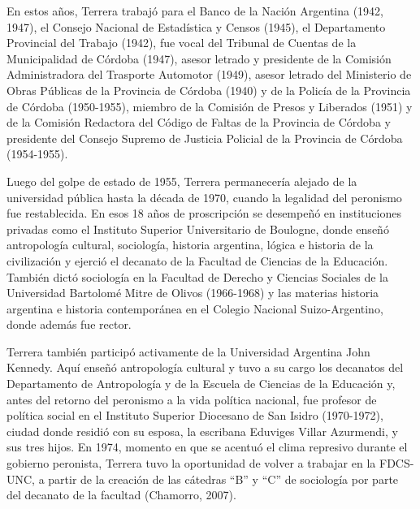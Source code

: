En estos años, Terrera trabajó para el Banco de la Nación Argentina (1942, 1947), el Consejo Nacional de Estadística y Censos (1945), el Departamento Provincial del Trabajo (1942), fue vocal del Tribunal de Cuentas de la Municipalidad de Córdoba (1947), asesor letrado y presidente de la Comisión Administradora del Trasporte Automotor (1949), asesor letrado del Ministerio de Obras Públicas de la Provincia de Córdoba (1940) y de la Policía de la Provincia de Córdoba (1950-1955), miembro de la Comisión de Presos y Liberados (1951) y de la Comisión Redactora del Código de Faltas de la Provincia de Córdoba y presidente del Consejo Supremo de Justicia Policial de la Provincia de Córdoba (1954-1955).

Luego del golpe de estado de 1955, Terrera permanecería alejado de la universidad pública hasta la década de 1970, cuando la legalidad del peronismo fue restablecida. En esos 18 años de proscripción se desempeñó en instituciones privadas como el Instituto Superior Universitario de Boulogne, donde enseñó antropología cultural, sociología, historia argentina, lógica e historia de la civilización y ejerció el decanato de la Facultad de Ciencias de la Educación. También dictó sociología en la Facultad de Derecho y Ciencias Sociales de la Universidad Bartolomé Mitre de Olivos (1966-1968) y las materias historia argentina e historia contemporánea en el Colegio Nacional Suizo-Argentino, donde además fue rector.

Terrera también participó activamente de la Universidad Argentina John Kennedy. Aquí enseñó antropología cultural y tuvo a su cargo los decanatos del Departamento de Antropología y de la Escuela de Ciencias de la Educación y, antes del retorno del peronismo a la vida política nacional, fue profesor de política social en el Instituto Superior Diocesano de San Isidro (1970-1972), ciudad donde residió con su esposa, la escribana Eduviges Villar Azurmendi, y sus tres hijos. En 1974, momento en que se acentuó el clima represivo durante el gobierno peronista, Terrera tuvo la oportunidad de volver a trabajar en la FDCS-UNC, a partir de la creación de las cátedras \enquote{B} y \enquote{C} de sociología por parte del decanato de la facultad (Chamorro, 2007).

